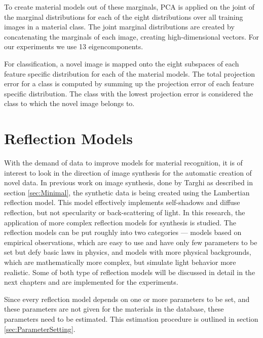 To create material models out of these marginals, PCA is applied on the joint of the marginal distributions for each of the eight distributions over all training images in a material class. The joint marginal distributions are created by concatenating the marginals of each image, creating high-dimensional vectors. For our experiments we use 13 eigencomponents.

For classification, a novel image is mapped onto the eight subspaces of each feature specific distribution for each of the material models. The total projection error for a class is computed by summing up the projection error of each feature specific distribution. The class with the lowest projection error is considered the class to which the novel image belongs to. 

\section{Reflection Models}\label{sec:ReflectionModels}
With the demand of data to improve models for material recognition, it is of interest to look in the direction of image synthesis for the automatic creation of novel data. In previous work on image synthesis, done by Targhi as described in section \ref{sec:Minimal}, the synthetic data is being created using the Lambertian reflection model. This model effectively implements self-shadows and diffuse reflection, but not specularity or back-scattering of light. In this research, the application of more complex reflection models for synthesis is studied. The reflection models can be put roughly into two categories --- models based on empirical observations, which are easy to use and have only few parameters to be set but defy basic laws in physics, and models with more physical backgrounds, which are mathematically more complex, but simulate light behavior more realistic. Some of both type of reflection models will be discussed in detail in the next chapters and are implemented for the experiments.

Since every reflection model depends on one or more parameters to be set, and these parameters are not given for the materials in the database, these parameters need to be estimated. This estimation procedure is outlined in section \ref{sec:ParameterSetting}.


